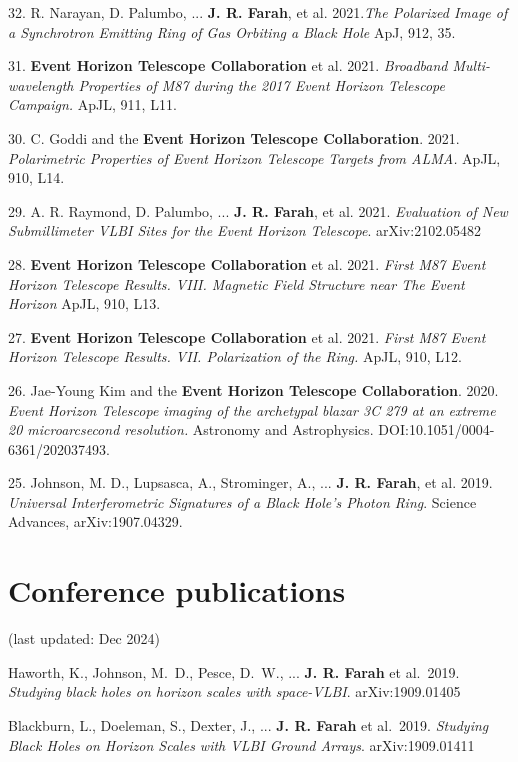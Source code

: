 \documentclass[margin,line]{res}
\begin{document}
\begin{resume}
32. R. Narayan, D. Palumbo, ... \textbf{J. R. Farah}, et al. 2021.\textit{The Polarized Image of a Synchrotron Emitting Ring of Gas Orbiting a Black Hole} ApJ, 912, 35.

31. \textbf{Event Horizon Telescope Collaboration} et al. 2021.\textit{ Broadband Multi-wavelength Properties of M87 during the 2017 Event Horizon Telescope Campaign.} ApJL, 911, L11.

30. C. Goddi and the \textbf{Event Horizon Telescope Collaboration}. 2021.\textit{ Polarimetric Properties of Event Horizon Telescope Targets from ALMA.} ApJL, 910, L14.

29. A. R. Raymond, D. Palumbo, ... \textbf{J. R. Farah}, et al. 2021. \textit{Evaluation of New Submillimeter VLBI Sites for the Event Horizon Telescope}. arXiv:2102.05482

28. \textbf{Event Horizon Telescope Collaboration} et al. 2021.\textit{ First M87 Event Horizon Telescope Results. VIII. Magnetic Field Structure near The Event Horizon} ApJL, 910, L13.

27. \textbf{Event Horizon Telescope Collaboration} et al. 2021.\textit{ First M87 Event Horizon Telescope Results. VII. Polarization of the Ring.} ApJL, 910, L12.




26. Jae-Young Kim and the \textbf{Event Horizon Telescope Collaboration}. 2020.\textit{ Event Horizon Telescope imaging of the archetypal blazar 3C 279 at an extreme 20 microarcsecond resolution.} Astronomy and Astrophysics. DOI:10.1051/0004-6361/202037493.

25. Johnson, M. D., Lupsasca, A., Strominger, A., ... \textbf{J. R. Farah}, et al. 2019. \textit{Universal Interferometric Signatures of a Black Hole’s Photon Ring}. Science Advances, arXiv:1907.04329.



\vspace{+.4cm}
\section{\sc Conference publications}
(last updated: Dec 2024)

Haworth, K., Johnson, M.~D., Pesce, D.~W., ... \textbf{J. R. Farah}  et al.\ 2019. \textit{Studying black holes on horizon scales with space-VLBI}. arXiv:1909.01405 

Blackburn, L., Doeleman, S., Dexter, J., ... \textbf{J. R. Farah} et al.\ 2019. \textit{Studying Black Holes on Horizon Scales with VLBI Ground Arrays}. arXiv:1909.01411 


\end{resume}
\end{document}
